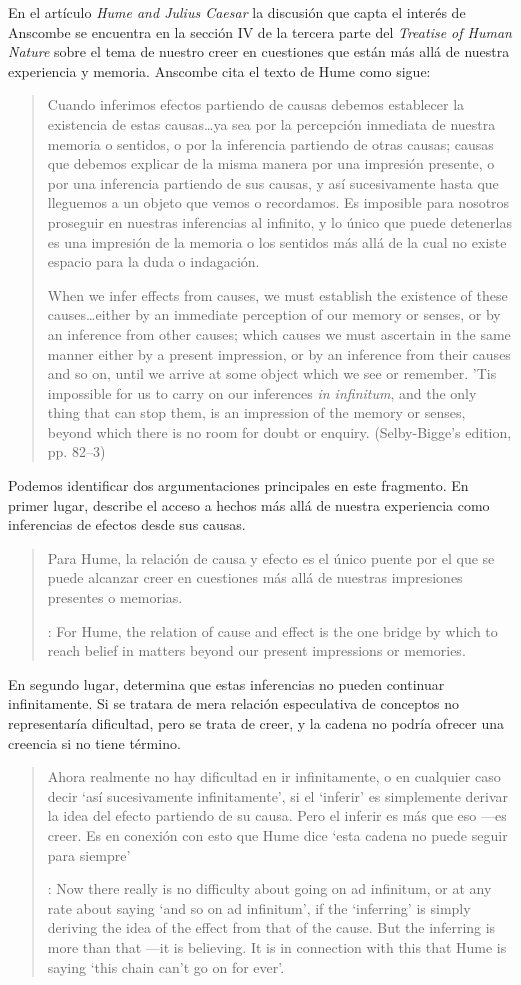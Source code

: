 En el artículo \emph{Hume and Julius Caesar} la discusión que capta el interés
de Anscombe se encuentra en la sección IV de la tercera parte del \emph{Treatise
of Human Nature} sobre el tema de nuestro creer en cuestiones que están más allá
de nuestra experiencia y memoria. Anscombe cita el texto de Hume como sigue:

\blockquote[{\cite[86]{anscombe1981hjc}}When we infer effects from causes, we
must establish the existence of these causes\ldots either by an immediate
perception of our memory or senses, or by an inference from other causes; which
causes we must ascertain in the same manner either by a present impression, or
by an inference from their causes and so on, until we arrive at some object
which we see or remember. 'Tis impossible for us to carry on our inferences
\emph{in infinitum}, and the only thing that can stop them, is an impression of
the memory or senses, beyond which there is no room for doubt or enquiry.
(Selby-Bigge's edition, pp. 82--3)]{Cuando inferimos efectos partiendo de causas
  debemos establecer la existencia de estas causas\ldots ya sea por la
  percepción inmediata de nuestra memoria o sentidos, o por la inferencia
  partiendo de otras causas; causas que debemos explicar de la misma manera por
  una impresión presente, o por una inferencia partiendo de sus causas, y así
  sucesivamente hasta que lleguemos a un objeto que vemos o recordamos. Es
  imposible para nosotros proseguir en nuestras inferencias al infinito, y lo
  único que puede detenerlas es una impresión de la memoria o los sentidos más
  allá de la cual no existe espacio para la duda o indagación.}

Podemos identificar dos argumentaciones principales en este fragmento. En primer
lugar, describe el acceso a hechos más allá de nuestra experiencia como
inferencias de efectos desde sus causas.
\blockquote[{\cite[87]{anscombe1981hjc}}: For Hume, the relation of cause and
effect is the one bridge by which to reach belief in matters beyond our present
impressions or memories.]{Para Hume, la relación de causa y efecto es el único
  puente por el que se puede alcanzar creer en cuestiones más allá de nuestras
  impresiones presentes o memorias.}

En segundo lugar, determina que estas inferencias no pueden continuar
infinitamente. Si se tratara de mera relación especulativa de conceptos no
representaría dificultad, pero se trata de creer, y la cadena no podría ofrecer
una creencia si no tiene término. \blockquote[{\cite[2762]{anscombe2011hoc}}:
Now there really is no difficulty about going on ad infinitum, or at any rate
about saying ‘and so on ad infinitum’, if the ‘inferring’ is simply deriving the
idea of the effect from that of the cause. But the inferring is more than that
---it is believing. It is in connection with this that Hume is saying ‘this
chain can’t go on for ever’.]{Ahora realmente no hay dificultad en ir
  infinitamente, o en cualquier caso decir `así sucesivamente infinitamente', si
  el `inferir' es simplemente derivar la idea del efecto partiendo de su causa.
  Pero el inferir es más que eso ---es creer. Es en conexión con esto que Hume
  dice `esta cadena no puede seguir para siempre'}


